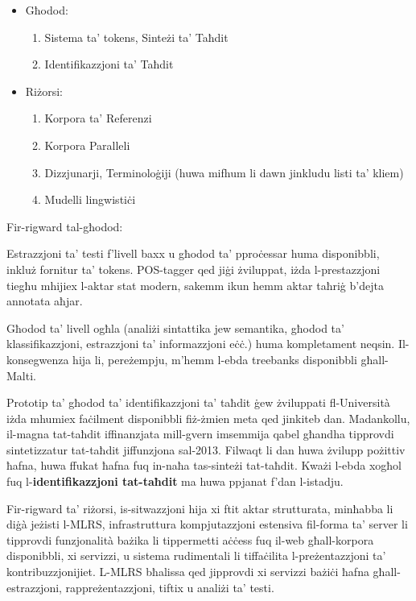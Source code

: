 \documentclass[]{../../metanetpaper}
\begin{document}
\begin{multicols}{2}
\begin{itemize}
\item Għodod:
\begin{enumerate}
\item Sistema ta’ tokens, Sinteżi ta’ Taħdit 
\item Identifikazzjoni ta’ Taħdit 
\end{enumerate}

\item Riżorsi: 
\begin{enumerate}
\item Korpora ta’ Referenzi 
\item Korpora Paralleli 
\item Dizzjunarji, Terminoloġiji (huwa mifhum li dawn jinkludu listi ta’ kliem) 
\item Mudelli lingwistiċi 
\end{enumerate}

\end{itemize}

Fir-rigward tal-għodod:

Estrazzjoni ta’ testi f’livell baxx u għodod ta’ pproċessar huma disponibbli, inkluż fornitur ta’ tokens. POS-tagger qed jiġi żviluppat, iżda l-prestazzjoni tiegħu mhijiex l-aktar stat modern, sakemm ikun hemm aktar taħriġ b’dejta annotata aħjar.

Għodod ta’ livell ogħla (analiżi sintattika jew semantika, għodod ta’ klassifikazzjoni, estrazzjoni ta’ informazzjoni eċċ.) huma kompletament neqsin. Il-konsegwenza hija li, pereżempju, m’hemm l-ebda treebanks disponibbli għall-Malti.

Prototip ta’ għodod ta’ identifikazzjoni ta’ taħdit ġew żviluppati fl-Università iżda mhumiex faċilment disponibbli fiż-żmien meta qed jinkiteb dan. Madankollu, il-magna tat-taħdit iffinanzjata mill-gvern imsemmija qabel għandha tipprovdi sintetizzatur tat-taħdit jiffunzjona sal-2013. Filwaqt li dan huwa żvilupp pożittiv ħafna, huwa ffukat ħafna fuq in-naħa tas-sinteżi tat-taħdit. Kważi l-ebda xogħol fuq l-\textbf{identifikazzjoni tat-taħdit} ma huwa ppjanat f'dan l-istadju.

Fir-rigward ta’ riżorsi, is-sitwazzjoni hija xi ftit aktar strutturata, minħabba li diġà jeżisti l-MLRS, infrastruttura kompjutazzjoni estensiva fil-forma ta’ server li tipprovdi funzjonalità bażika li tippermetti aċċess fuq il-web għall-korpora disponibbli, xi servizzi, u sistema rudimentali li tiffaċilita l-preżentazzjoni ta’ kontribuzzjonijiet. L-MLRS bħalissa qed jipprovdi xi servizzi bażiċi ħafna għall-estrazzjoni, rappreżentazzjoni, tiftix u analiżi ta’ testi.


\end{multicols}
\end{document}
